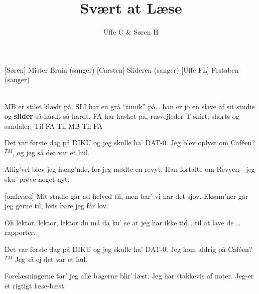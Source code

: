 \documentclass[a4paper]{article}
\title{Svært at Læse}
\author{Uffe C \& Søren H}
\begin{document}
\maketitle

\begin{roles}
[Søren] Mister Brain (sanger)
[Carsten] Slideren (sanger)
[Uffe FL] Festaben (sanger)\\\\
\end{roles}

\begin{props}
   MB er stilet klædt på.
   SLI har en grå ``tunik'' på\ldots{} han er jo en
  slave af sit studie og \textbf{slider} så hårdt så hårdt.
   FA har kasket på, rusvejleder-T-shirt, shorts
  og sandaler.
   Til FA
   Til MB
   Til FA
\end{props}

\begin{song}
  Det var første dag på DIKU og jeg skulle ha' DAT-0.
  Jeg blev oplyst om Caf\'een?$^{TM}$, og jeg så det var et hul.
  
  Allig'vel blev jeg hæng'nde, for jeg mødte en revyt.
  Han fortalte om Revyen - jeg sku' prøve noget nyt.
  
  [omkvæd]
  Mit studie går ad helved til, men bar' vi har det sjov.
  Eksam'ner går jeg gerne til, hvis bare jeg får lov.
  
  Oh lektor, lektor, lektor du må da ku' se
  at jeg har ikke tid\ldots{}
  til at lave de \ldots rapporter.
\end{song}



\begin{song}[Kapitalismen]
  Det var første dag på DIKU
  og jeg skulle ha' DAT-0.
  Jeg kom aldrig på Caf\'een?$^{TM}$
  Jeg så ej det var et hul.
  
  Forelæsningerne tar' jeg
  alle bøgerne blir' læst.
  Jeg har stakkevis af noter.
  Jeg-er et rigtigt læse-bæst.
\end{song}
\end{document}
